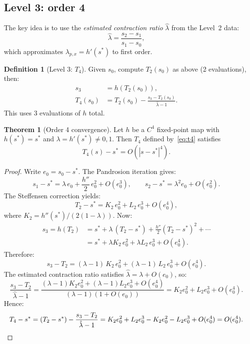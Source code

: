 \documentclass[11pt,a4paper]{article}
\theoremstyle{definition}
\newtheorem{definition}{Definition}[section]
\newtheorem{theorem}{Theorem}[section]
\begin{document}
\subsection{Level 3: order 4}

The key idea is to use the \emph{estimated contraction ratio} $\hat{\lambda}$ from the Level~2 data:
\begin{equation}
  \label{eq:lambda_hat}
  \hat{\lambda} = \frac{s_2 - s_1}{s_1 - s_0},
\end{equation}
which approximates $\lambda_{p,x} = h'(s^*)$ to first order.

\begin{definition}[Level 3: $T_4$]
\label{def:T4}
Given $s_0$, compute $T_2(s_0)$ as above (2 evaluations), then:
\begin{align}
  s_3 &= h(T_2(s_0)), \label{eq:t4_s3} \\
  T_4(s_0) &= T_2(s_0) - \frac{s_3 - T_2(s_0)}{\hat{\lambda} - 1}. \label{eq:t4}
\end{align}
This uses $3$ evaluations of $h$ total.
\end{definition}

\begin{theorem}[Order 4 convergence]
\label{thm:order4}
Let $h$ be a $C^4$ fixed-point map with $h(s^*) = s^*$ and $\lambda = h'(s^*) \neq 0, 1$.  Then $T_4$ defined by~\eqref{eq:t4} satisfies
\begin{equation}
  \label{eq:order4}
  T_4(s) - s^* = O(|s - s^*|^4).
\end{equation}
\end{theorem}

\begin{proof}
Write $e_0 = s_0 - s^*$.  The Pandrosion iteration gives:
\[
  s_1 - s^* = \lambda\, e_0 + \frac{h''}{2}\,e_0^2 + O(e_0^3),
  \qquad
  s_2 - s^* = \lambda^2 e_0 + O(e_0^2).
\]
The Steffensen correction yields:
\[
  T_2 - s^* = K_2 \, e_0^2 + L_2 \, e_0^3 + O(e_0^4),
\]
where $K_2 = h''(s^*)/(2(1-\lambda))$.  Now:
\begin{align*}
  s_3 = h(T_2) &= s^* + \lambda\,(T_2 - s^*) + \frac{h''}{2}(T_2 - s^*)^2 + \cdots \\
  &= s^* + \lambda K_2\, e_0^2 + \lambda L_2\, e_0^3 + O(e_0^4).
\end{align*}
Therefore:
\[
  s_3 - T_2 = (\lambda - 1)\, K_2\, e_0^2 + (\lambda - 1)\, L_2\, e_0^3 + O(e_0^4).
\]
The estimated contraction ratio satisfies $\hat{\lambda} = \lambda + O(e_0)$, so:
\[
  \frac{s_3 - T_2}{\hat{\lambda} - 1}
  = \frac{(\lambda - 1)K_2 e_0^2 + (\lambda - 1)L_2 e_0^3 + O(e_0^4)}{(\lambda - 1)(1 + O(e_0))}
  = K_2 e_0^2 + L_2 e_0^3 + O(e_0^4).
\]
Hence:
\[
  T_4 - s^* = (T_2 - s^*) - \frac{s_3 - T_2}{\hat{\lambda} - 1}
  = K_2 e_0^2 + L_2 e_0^3 - K_2 e_0^2 - L_2 e_0^3 + O(e_0^4)
  = O(e_0^4). \qedhere
\]
\end{proof}
\end{document}
